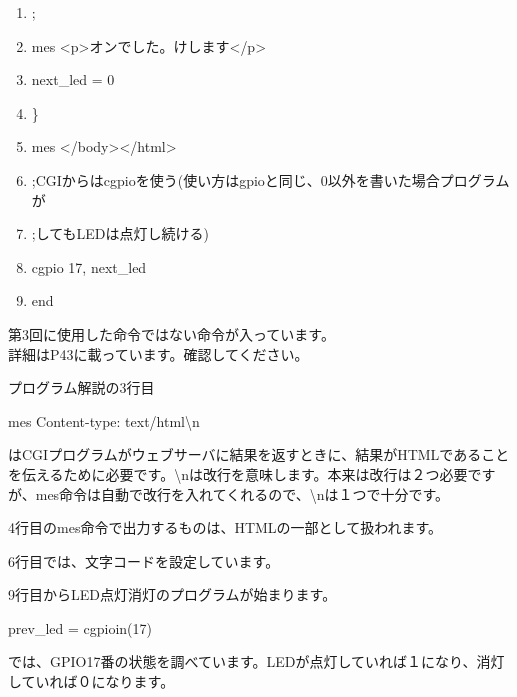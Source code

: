 \documentclass[a4paper,12pt,dvipdfmx]{jarticle}
\begin{document}
\begin{boxedminipage}{0.95\textwidth}
\begin{enumerate}
	\item ;

	\item mes
		{\textquotedbl}{\textless}p{\textgreater}オンでした。けします{\textless}/p{\textgreater}{\textquotedbl}

	\item next\_led = 0

	\item \}

	\item mes {\textquotedbl}{\textless}/body{\textgreater}{\textless}/html{\textgreater}{\textquotedbl}

	\item ;CGIからはcgpioを使う(使い方はgpioと同じ、0以外を書いた場合プログラムが

	\item ;してもLEDは点灯し続ける)

	\item cgpio 17, next\_led

	\item end
	\end{enumerate}

\end{boxedminipage}
\flushleft



第3回に使用した命令ではない命令が入っています。\\
詳細はP43に載っています。確認してください。

プログラム解説の3行目

mes {\textquotedbl}Content-type: text/html{\textbackslash}n{\textquotedbl}

はCGIプログラムがウェブサーバに結果を返すときに、結果がHTMLであることを伝えるために必要です。{\textbackslash}nは改行を意味します。本来は改行は２つ必要ですが、mes命令は自動で改行を入れてくれるので、{\textbackslash}nは１つで十分です。


\bigskip
\clearpage
4行目のmes命令で出力するものは、HTMLの一部として扱われます。

\bigskip

6行目では、文字コードを設定しています。

\bigskip

9行目からLED点灯消灯のプログラムが始まります。

prev\_led = cgpioin(17)

では、GPIO17番の状態を調べています。LEDが点灯していれば１になり、消灯していれば０になります。
\end{document}

